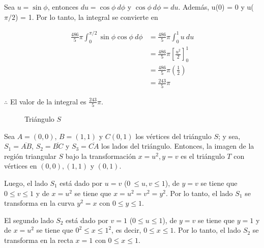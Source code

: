 \documentclass[12pt]{exam}
\begin{document}
\begin{questions}
    Sea $u = \sin{\phi}$, entonces $du = \cos{\phi}~d\phi$ y $\cos{\phi}~d\phi = du$. Además, u(0) = 0 y u($\pi/2$) = 1. Por lo tanto, la integral se convierte en

    \begin{align*}
      \frac{486}{5} \pi \int_{0}^{\pi/2}\sin{\phi}\cos{\phi}~d\phi
      &= \frac{486}{5} \pi \int_{0}^{1}u~du\\
      &= \frac{486}{5} \pi \left[\frac{u^2}{2}\right]_{0}^{1}\\
      &= \frac{486}{5} \pi \left(\frac{1}{2}\right)\\
      &= \frac{243}{5} \pi
    \end{align*}

    $\therefore$ El valor de la integral es $\frac{243}{5} \pi$.


  \begin{figure}[H]
    \centering
    \caption{Triángulo $S$}
  \end{figure}

  Sea $A=(0,0)$, $B=(1,1)$ y $C(0,1)$ los vértices del triángulo $S$; y sea, $S_1=\overline{AB}$, $S_2=\overline{BC}$ y $S_3=\overline{CA}$ los lados del triángulo. 
  Entonces, la imagen de la región triangular $S$ bajo la transformación $x = u^2, y = v$ es el triángulo $T$ con vértices en $(0, 0), (1, 1)$ y $(0, 1)$.

  Luego, el lado $S_1$ está dado por $u=v$ ($0 \ \leq u,v \leq 1$), de $y=v$ se tiene que $0 \leq v \leq 1$ y de $x=u^2$ se tiene que $x=u^2=v^2=y^2$. 
  Por lo tanto, el lado $S_1$ se transforma en la curva $y^2=x$ con $0 \leq y \leq 1$.

  El segundo lado $S_2$ está dado por $v=1$ ($0 \leq u \leq 1$), de $y=v$ se tiene que $y=1$ y de $x=u^2$ se tiene que $0^2 \leq x \leq 1^2$, es decir, $0 \leq x \leq 1$.
  Por lo tanto, el lado $S_2$ se transforma en la recta $x=1$ con $0 \leq x \leq 1$.


\end{questions}
\end{document}

